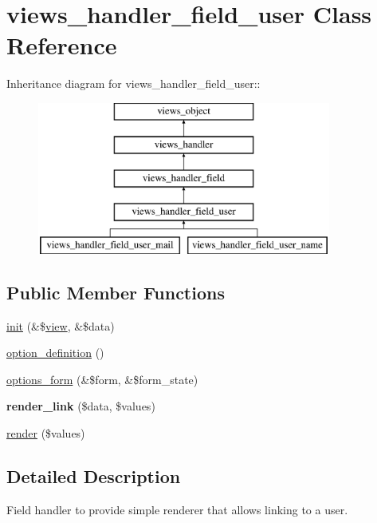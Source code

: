 \hypertarget{classviews__handler__field__user}{
\section{views\_\-handler\_\-field\_\-user Class Reference}
\label{classviews__handler__field__user}
}
Inheritance diagram for views\_\-handler\_\-field\_\-user::\begin{figure}[H]
\begin{center}
\leavevmode
\includegraphics[height=5cm]{classviews__handler__field__user}
\end{center}
\end{figure}
\subsection*{Public Member Functions}
\begin{CompactItemize}
\item 
\hyperlink{classviews__handler__field__user_94156733dfddeb57dbd856e0f574cde6}{init} (\&\$\hyperlink{classview}{view}, \&\$data)
\item 
\hyperlink{classviews__handler__field__user_545d229a041bf920b95ac59d89b1e4b2}{option\_\-definition} ()
\item 
\hyperlink{classviews__handler__field__user_ecf77682fa7dc9daf1fa97cbe045420d}{options\_\-form} (\&\$form, \&\$form\_\-state)
\item 
\hypertarget{classviews__handler__field__user_d3ed8d04736b14db03cba8b98757b3ff}{
\textbf{render\_\-link} (\$data, \$values)}
\label{classviews__handler__field__user_d3ed8d04736b14db03cba8b98757b3ff}

\item 
\hyperlink{classviews__handler__field__user_145dcce889ee17821a1d9c65970d86f2}{render} (\$values)
\end{CompactItemize}


\subsection{Detailed Description}
Field handler to provide simple renderer that allows linking to a user. 

